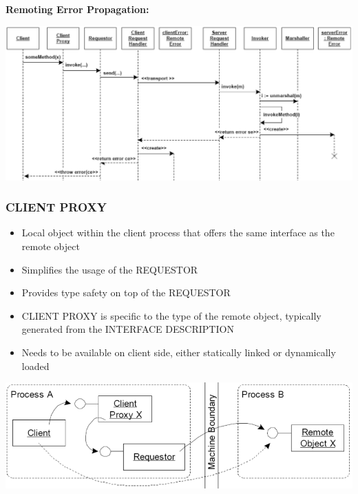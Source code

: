 \documentclass[10pt]{article}
\begin{document}
\textbf{Remoting Error Propagation:}
\begin{center}
	\includegraphics[scale=0.25]{remoting-error-propagation.png}
\end{center}
\subsubsection{CLIENT PROXY}
\begin{itemize}
	\item Local object within the client process that offers the same interface as the remote object
	\item Simplifies the usage of the REQUESTOR
	\item Provides type safety on top of the REQUESTOR
	\item CLIENT PROXY is specific to the type of the remote object, typically generated from the INTERFACE DESCRIPTION
	\item Needs to be available on client side, either statically linked or dynamically loaded
\end{itemize}
\begin{center}
	\includegraphics[scale=0.2]{client-proxy.png}
\end{center}
\end{document}
